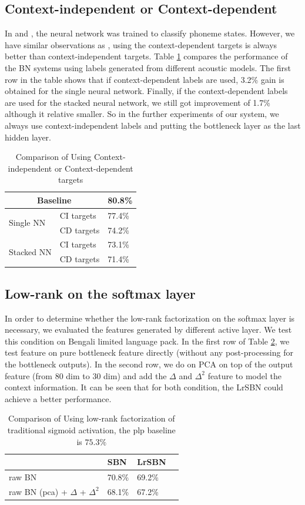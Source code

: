 \documentclass{article}
\begin{document}
\subsection{Context-independent or Context-dependent}
In \cite{Martin2013} and \cite{CMU2013}, the neural network was trained to classify phoneme states. However, we have similar observations as \cite{MSBN}, using the context-dependent targets is always better than context-independent targets. Table \ref{lab:CI} compares the performance of the BN systems using labels generated from different acoustic models. The first row in the table shows that if context-dependent labels are used, 3.2\% gain is obtained for the single neural network.
Finally, if the context-dependent labels are used for the stacked neural network, we still got improvement of 1.7\% although it relative smaller. So in the further experiments of our system, we always use context-independent labels and putting the bottleneck layer as the last hidden layer.

\begin{table}[htb]
  \centering
  \caption{Comparison of Using Context-independent or Context-dependent targets}
  \label{lab:CI}
  \begin{tabular}{|l|l|l|}
    \hline
    \multicolumn{2}{|c|}{Baseline} & 80.8\%\\
    \hline\hline
    \multirow{2}{*}{Single NN} & CI targets & 77.4\%\\
     & CD targets & 74.2\%\\ \hline
     \multirow{2}{*}{Stacked NN} & CI targets & 73.1\%\\
     & CD targets & 71.4\%\\ \hline
   \end{tabular}
\end{table}
\subsection{Low-rank on the softmax layer}
In order to determine whether the low-rank factorization on the softmax layer is necessary, we evaluated the features generated by different active layer.
We test this condition on Bengali limited language pack. In the first row of Table \ref{tab:linear}, we test feature on pure bottleneck feature directly (without any post-processing for the bottleneck outputs). In the second row, we do on PCA on top of the output feature (from 80 dim to 30 dim) and add the $\Delta$ and $\Delta^2$ feature to model the context information. It can be seen that for both condition, the LrSBN could achieve a better performance.
\begin{table}[htb]
  \centering
  \caption{Comparison of Using low-rank factorization of traditional sigmoid activation, the plp baseline is $75.3\%$}
  \label{tab:linear}
  \begin{tabular}{|l|l|l|l|}
    \hline
      & SBN & LrSBN\\\hline
    raw BN & 70.8\% & 69.2\%\\\hline
    raw BN (pca) + $\Delta$ + $\Delta^2$ & 68.1\% & 67.2\%\\\hline
  \end{tabular}
\end{table}
\end{document}
